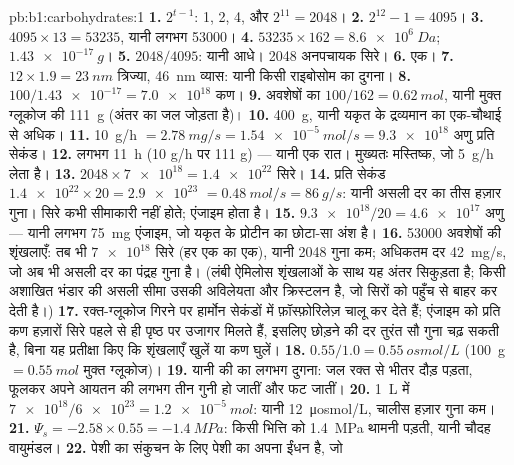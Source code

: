 \begin{solution}{pb:b1:carbohydrates:1}
\textbf{1.} $2^{t-1}$: 1, 2, 4, और $2^{11} = 2048$।
\textbf{2.} $2^{12} - 1 = 4095$।
\textbf{3.} $4095\times 13 = \num{53235}$, यानी लगभग \num{53000}।
\textbf{4.} $\num{53235}\times 162 = \qty{8.6e6}{Da}$;
$\qty{1.43e-17}{g}$।
\textbf{5.} $2048/4095$: यानी आधे। \num{2048} अनपचायक सिरे।
\textbf{6.} एक।
\textbf{7.} $12\times 1.9 = \qty{23}{nm}$ त्रिज्या, \qty{46}{nm}
व्यास: यानी किसी राइबोसोम का दुगना।
\textbf{8.} $100/\num{1.43e-17} = \num{7.0e18}$ कण।
\textbf{9.} अवशेषों का $100/162 = \qty{0.62}{mol}$, यानी मुक्त ग्लूकोज
की \qty{111}{g} (अंतर  का जल जोड़ता है)।
\textbf{10.} \qty{400}{g}, यानी यकृत के द्रव्यमान का एक-चौथाई से अधिक।
\textbf{11.} \qty{10}{g/h} $= \qty{2.78}{mg/s} = \qty{1.54e-5}{mol/s} =
\num{9.3e18}$ अणु प्रति सेकंड।
\textbf{12.} लगभग \qty{11}{h} (10 g/h पर 111 g) --- यानी एक रात। मुख्यतः
मस्तिष्क, जो \qty{5}{g/h} लेता है।
\textbf{13.} $2048\times\num{7e18} = \num{1.4e22}$ सिरे।
\textbf{14.} प्रति सेकंड $\num{1.4e22}\times 20 = \num{2.9e23}$ $=
\qty{0.48}{mol/s} = \qty{86}{g/s}$: यानी असली दर का तीस हज़ार गुना।
सिरे कभी सीमाकारी नहीं होते; एंजाइम होता है।
\textbf{15.} $\num{9.3e18}/20 = \num{4.6e17}$ अणु --- यानी लगभग
\qty{75}{mg} एंजाइम, जो यकृत के प्रोटीन का छोटा-सा अंश है।
\textbf{16.} \num{53000} अवशेषों की शृंखलाएँ: तब भी $\num{7e18}$ सिरे
(हर एक का एक), यानी \num{2048} गुना कम; अधिकतम दर \qty{42}{mg/s}, जो
अब भी असली दर का पंद्रह गुना है। (लंबी ऐमिलोस शृंखलाओं के साथ यह अंतर
सिकुड़ता है; किसी अशाखित भंडार की असली सीमा उसकी अविलेयता और
क्रिस्टलन है, जो सिरों को पहुँच से बाहर कर देती है।)
\textbf{17.} रक्त-ग्लूकोज गिरने पर हार्मोन सेकंडों में फ़ॉस्फ़ोरिलेज़
चालू कर देते हैं; एंजाइम को प्रति कण हज़ारों सिरे पहले से ही पृष्ठ पर
उजागर मिलते हैं, इसलिए छोड़ने की दर तुरंत सौ गुना चढ़ सकती है, बिना यह
प्रतीक्षा किए कि शृंखलाएँ खुलें या कण घुलें।
\textbf{18.} $0.55/1.0 = \qty{0.55}{osmol/L}$ (\qty{100}{g}
$= \qty{0.55}{mol}$ मुक्त ग्लूकोज)।
\textbf{19.} यानी  की  का लगभग दुगना: जल रक्त से
भीतर दौड़ पड़ता,  फूलकर अपने आयतन की लगभग तीन गुनी हो जातीं और
फट जातीं।
\textbf{20.} \qty{1}{L} में $\num{7e18}/\num{6e23} = \qty{1.2e-5}{mol}$:
यानी \qty{12}{\micro osmol/L}, चालीस हज़ार गुना कम।
\textbf{21.} $\Psi_s = -2.58\times 0.55 = \qty{-1.4}{MPa}$: किसी भित्ति
को \qty{1.4}{MPa} थामनी पड़ती, यानी चौदह वायुमंडल।
\textbf{22.} पेशी का  संकुचन के लिए पेशी का अपना ईंधन है, जो

\end{solution}
